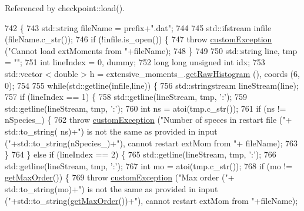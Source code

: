 Referenced by checkpoint\-::load().


\begin{DoxyCode}
742                                                                                          \{
743     std::string fileName = prefix+\textcolor{stringliteral}{".dat"};
744 
745     std::ifstream infile (fileName.c\_str());
746     \textcolor{keywordflow}{if} (!infile.is\_open()) \{
747         \textcolor{keywordflow}{throw} \hyperlink{classcustom_exception}{customException} (\textcolor{stringliteral}{"Cannot load extMoments from "}+fileName);
748     \}
749 
750     std::string line, tmp = \textcolor{stringliteral}{""};
751     \textcolor{keywordtype}{int} lineIndex = 0, dummy;
752     \textcolor{keywordtype}{long} \textcolor{keywordtype}{long} \textcolor{keywordtype}{unsigned} \textcolor{keywordtype}{int} idx;
753     std::vector < double > h = extensive\_moments\_.\hyperlink{classhistogram_a3a75adbce72057f3a4db805d9efc3c9c}{getRawHistogram} (), coords (6, 0);
754 
755     \textcolor{keywordflow}{while}(std::getline(infile,line)) \{
756         std::stringstream lineStream(line);
757         \textcolor{keywordflow}{if} (lineIndex == 1) \{
758             std::getline(lineStream, tmp, \textcolor{charliteral}{':'});
759             std::getline(lineStream, tmp, \textcolor{charliteral}{':'});
760             \textcolor{keywordtype}{int} ns = atoi(tmp.c\_str());
761             \textcolor{keywordflow}{if} (ns != nSpecies\_) \{
762                 \textcolor{keywordflow}{throw} \hyperlink{classcustom_exception}{customException} (\textcolor{stringliteral}{"Number of speces in restart file ("}+ std::to\_string(
      ns)+\textcolor{stringliteral}{") is not the same as provided in input ("}+std::to\_string(nSpecies\_)+\textcolor{stringliteral}{"), cannot restart extMom from "}+
      fileName);
763             \}
764         \} \textcolor{keywordflow}{else} \textcolor{keywordflow}{if} (lineIndex == 2) \{
765             std::getline(lineStream, tmp, \textcolor{charliteral}{':'});
766             std::getline(lineStream, tmp, \textcolor{charliteral}{':'});
767             \textcolor{keywordtype}{int} mo = atoi(tmp.c\_str());
768             \textcolor{keywordflow}{if} (mo != \hyperlink{classsim_system_afe08187d318113c33bda890c69570c36}{getMaxOrder}()) \{
769                 \textcolor{keywordflow}{throw} \hyperlink{classcustom_exception}{customException} (\textcolor{stringliteral}{"Max order ("}+ std::to\_string(mo)+\textcolor{stringliteral}{") is not the same
       as provided in input ("}+std::to\_string(\hyperlink{classsim_system_afe08187d318113c33bda890c69570c36}{getMaxOrder}())+\textcolor{stringliteral}{"), cannot restart extMom from "}+fileName);

\end{DoxyCode}
